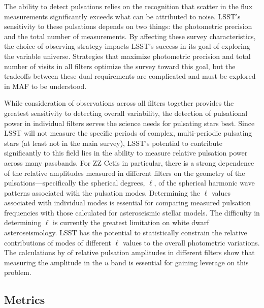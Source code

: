 The ability to detect pulsations relies on the recognition that scatter in the flux measurements significantly exceeds what can be attributed to noise.  LSST's sensitivity to these pulsations depends on two things: the photometric precision and the total number of measurements.  By affecting these survey characteristics, the choice of observing strategy impacts LSST's success in its goal of exploring the variable universe.  Strategies that maximize photometric precision and total number of visits in all filters optimize the survey toward this goal, but the tradeoffs between these dual requirements are complicated and must be explored in MAF to be understood.

While consideration of observations across all filters together provides the greatest sensitivity to detecting overall variability, the detection of pulsational power in individual filters serves the science needs for pulsating stars best.  Since LSST will not measure the specific periods of complex, multi-periodic pulsating stars (at least not in the main survey), LSST's potential to contribute significantly to this field lies in the ability to measure relative pulsation power across many passbands.  For ZZ Cetis in particular, there is a strong dependence of the relative amplitudes measured in different filters on the geometry of the pulsations---specifically the spherical degrees, $\ell$, of the spherical harmonic wave patterns associated with the pulsation modes.  Determining the $\ell$ values associated with individual modes is essential for comparing measured pulsation frequencies with those calculated for asteroseismic stellar models.  The difficulty in determining $\ell$ is currently the greatest limitation on white dwarf asteroseismology. LSST has the potential to statistically constrain the relative contributions of modes of different $\ell$ values to the overall photometric variations.  The calculations by \citet{1995ApJS...96..545B} of relative pulsation amplitudes in different filters show that measuring the amplitude in the $u$ band is essential for gaining leverage on this problem.


\subsection{Metrics}
\label{sec:\secname:metrics}

